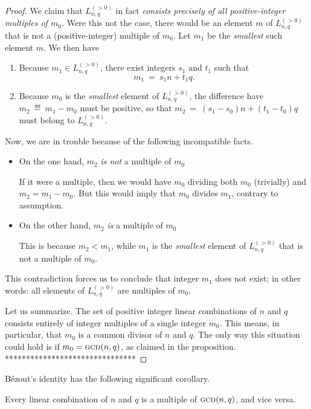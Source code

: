 \begin{proof}
{We claim that $L^{(>0)}_{n,q}$ in fact {\em consists precisely of all positive-integer multiples of $m_0$.}  Were this not the case, there would be an element $m$ of $L^{(>0)}_{n,q}$ that is not a (positive-integer) multiple of $m_0$.  Let $m_1$ be the {\em smallest} such element $m$.  We then have
\begin{enumerate}
\item
Because $m_1 \in L^{(>0)}_{n,q}$, there exist integers $s_1$ and $t_1$ such that
\[  m_1 \ = \ s_1 n + t_1 q. \]
\item
Because $m_0$ is the {\em smallest} element of $L^{(>0)}_{n,q}$, the difference have $m_2 \ \eqdef \ m_1 - m_0$ must be positive, so that $m_2 \ = \ (s_1 - s_0) n + (t_1 -t_0) q$ must belong to $L^{(>0)}_{n,q}$.
\end{enumerate}
Now, we are in trouble because of the following incompatible facts.
\begin{itemize}
\item
On the one hand, $m_2$ {\em is not} a multiple of $m_0$

\smallskip

If it were a multiple, then we would have $m_0$ dividing both $m_0$ (trivially) and $m_2 = m_1 - m_0$.  But this would imply that $m_0$ divides $m_1$, contrary to assumption.

\medskip\item
On the other hand, $m_2$ {\em is} a multiple of $m_0$

\smallskip

This is because $m_2 < m_1$, while $m_1$ is the {\em smallest} element of $L^{(>0)}_{n,q}$ that is not a multiple of $m_0$.
\end{itemize}
This contradiction forces us to conclude that integer $m_1$ does not exist; in other words: all elements of $L^{(>0)}_{n,q}$ are multiples of $m_0$.

Let us summarize.  The set of positive integer linear combinations of $n$ and $q$ consists entirely of integer multiples of a single integer $m_0$.  This means, in particular, that $m_0$ is a common divisor of $n$ and $q$.  The only way this situation could hold is if $m_0 = \mbox{\sc gcd}(n,q)$, as claimed in the proposition.  
*******************************}

\end{proof}

\noindent
B\'{e}zout's identity has the following significant corollary.

\begin{corol}
Every linear combination of $n$ and $q$ is a multiple of $\mbox{\sc gcd}(n,q)$, and vice versa.
\end{corol}


